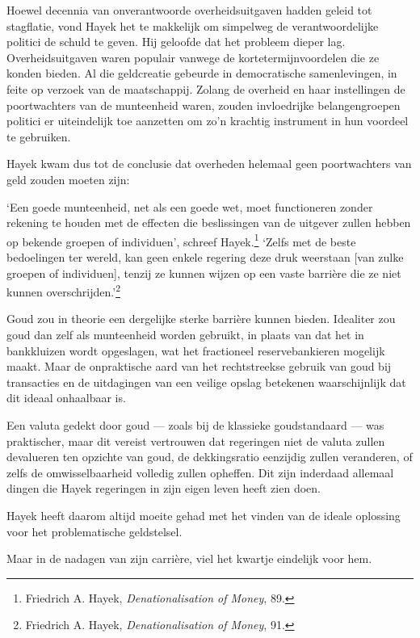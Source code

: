 \documentclass[
  a5paper,
  smalldemyvopaper,11pt,twoside,onecolumn,openright,extrafontsizes,
hidelinks]{memoir}
\begin{document}
Hoewel decennia van onverantwoorde overheidsuitgaven hadden geleid tot
stagflatie, vond Hayek het te makkelijk om simpelweg de
verantwoordelijke politici de schuld te geven. Hij geloofde dat het
probleem dieper lag. Overheidsuitgaven waren populair vanwege de
kortetermijnvoordelen die ze konden bieden. Al die geldcreatie gebeurde
in democratische samenlevingen, in feite op verzoek van de maatschappij.
Zolang de overheid en haar instellingen de poortwachters van de
munteenheid waren, zouden invloedrijke belangengroepen politici er
uiteindelijk toe aanzetten om zo'n krachtig instrument in hun voordeel
te gebruiken.

Hayek kwam dus tot de conclusie dat overheden helemaal geen
poortwachters van geld zouden moeten zijn:

`Een goede munteenheid, net als een goede wet, moet functioneren zonder
rekening te houden met de effecten die beslissingen van de uitgever
zullen hebben op bekende groepen of individuen', schreef
Hayek.\footnote{Friedrich A. Hayek, \emph{Denationalisation of Money},
  89.} `Zelfs met de beste bedoelingen ter wereld, kan geen enkele
regering deze druk weerstaan {[}van zulke groepen of individuen{]},
tenzij ze kunnen wijzen op een vaste barrière die ze niet kunnen
overschrijden.'\footnote{Friedrich A. \hspace{0pt}Hayek,
  \emph{Denationalisation of Money}, 91.}

Goud zou in theorie een dergelijke sterke barrière kunnen bieden.
Idealiter zou goud dan zelf als munteenheid worden gebruikt, in plaats
van dat het in bankkluizen wordt opgeslagen, wat het fractioneel
reservebankieren mogelijk maakt. Maar de onpraktische aard van het
rechtstreekse gebruik van goud bij transacties en de uitdagingen van een
veilige opslag betekenen waarschijnlijk dat dit ideaal onhaalbaar is.

Een valuta gedekt door goud --- zoals bij de klassieke goudstandaard ---
was praktischer, maar dit vereist vertrouwen dat regeringen niet de
valuta zullen devalueren ten opzichte van goud, de dekkingsratio
eenzijdig zullen veranderen, of zelfs de omwisselbaarheid volledig
zullen opheffen. Dit zijn inderdaad allemaal dingen die Hayek regeringen
in zijn eigen leven heeft zien doen.

Hayek heeft daarom altijd moeite gehad met het vinden van de ideale
oplossing voor het problematische geldstelsel.

Maar in de nadagen van zijn carrière, viel het kwartje eindelijk voor
hem.
\end{document}
